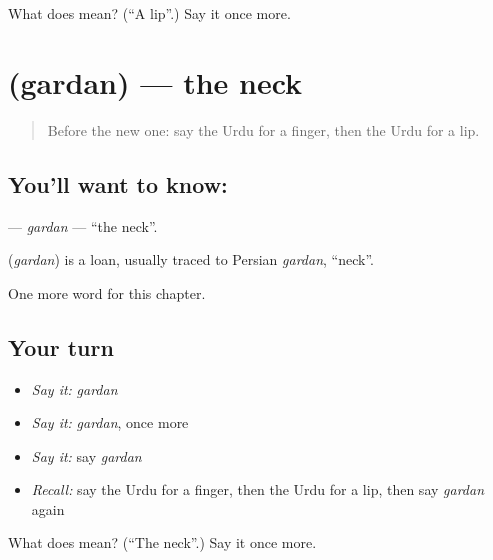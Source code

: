 \begin{tcolorbox}[breakable,colback=teal!4,colframe=teal!35!black,title={Before you move on}]
What does  mean? (\textquotedblleft{}A lip\textquotedblright{}.) Say it once more.
\end{tcolorbox}
\section[\texorpdfstring{\ur{گردن} (gardan)}{گردن (gardan)}]{ (gardan) — the neck}

\label{lesson:UR-C39-gardan}



\begin{quote}
Before the new one: say the Urdu for a finger, then the Urdu for a lip.
\end{quote}

\subsection*{You'll want to know: }
\textbf{} — \emph{gardan} — \textquotedblleft{}the neck\textquotedblright{}.

\begin{cousinweb}
\textbf{} (\emph{gardan}) is a loan, usually traced to Persian \emph{gardan}, \textquotedblleft{}neck\textquotedblright{}.
\end{cousinweb}

\begin{grammarlens}[title={What you've built}]
One more word for this chapter.
\end{grammarlens}

\subsection*{Your turn}
\begin{itemize}
\raggedright
  \item \emph{Say it:} \emph{gardan}
  \item \emph{Say it:} \emph{gardan}, once more
  \item \emph{Say it:} say \emph{gardan}
  \item \emph{Recall:} say the Urdu for a finger, then the Urdu for a lip, then say \emph{gardan} again
\end{itemize}

\begin{tcolorbox}[breakable,colback=teal!4,colframe=teal!35!black,title={Before you move on}]
What does  mean? (\textquotedblleft{}The neck\textquotedblright{}.) Say it once more.
\end{tcolorbox}
